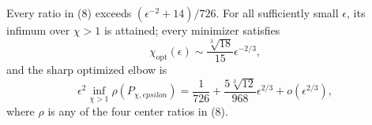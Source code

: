 Every ratio in (8) exceeds \((\epsilon^{-2}+14)/726\). For all sufficiently small \(\epsilon\), its infimum over \(\chi>1\) is attained; every minimizer satisfies
\[
 \chi_{\mathrm{opt}}(\epsilon)
 \sim\frac{\sqrt[3]{18}}{15}\epsilon^{-2/3},             \tag{9}
\]
and the sharp optimized elbow is
\[
 \epsilon^2\inf_{\chi>1}\rho(P_{\chi,epsilon})
 =\frac1{726}+\frac{5\sqrt[3]{12}}{968}\epsilon^{2/3}
 +o(\epsilon^{2/3}),                                      \tag{10}
\]
where \(\rho\) is any of the four center ratios in (8).